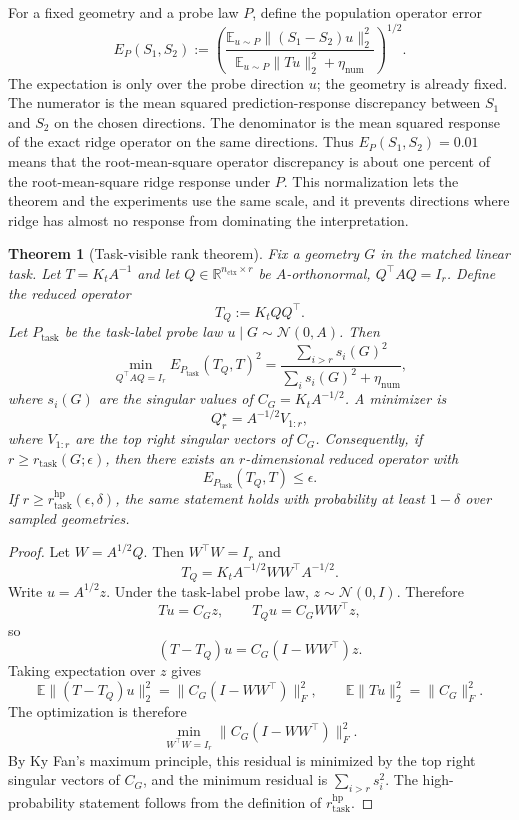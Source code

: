\documentclass[11pt]{article}
\newtheorem{theorem}{Theorem}
\newcommand{\R}{\mathbb{R}}
\newcommand{\E}{\mathbb{E}}
\begin{document}
For a fixed geometry and a probe law \(P\), define the population operator error
\[
E_P(S_1,S_2)
:=
\left(
\frac{
\E_{u\sim P}\|(S_1-S_2)u\|_2^2
}{
\E_{u\sim P}\|Tu\|_2^2+\eta_{\mathrm{num}}
}
\right)^{1/2}.
\]
The expectation is only over the probe direction \(u\); the geometry is already fixed. The numerator
is the mean squared prediction-response discrepancy between \(S_1\) and \(S_2\) on the chosen
directions. The denominator is the mean squared response of the exact ridge operator on the same
directions. Thus \(E_P(S_1,S_2)=0.01\) means that the root-mean-square operator discrepancy is
about one percent of the root-mean-square ridge response under \(P\). This normalization lets the
theorem and the experiments use the same scale, and it prevents directions where ridge has almost
no response from dominating the interpretation.

\begin{theorem}[Task-visible rank theorem]
Fix a geometry \(G\) in the matched linear task. Let \(T=K_tA^{-1}\) and let
\(Q\in\R^{n_{\mathrm{ctx}}\times r}\) be \(A\)-orthonormal, \(Q^\top A Q=I_r\). Define the reduced operator
\[
T_Q:=K_tQQ^\top.
\]
Let \(P_{\mathrm{task}}\) be the task-label probe law \(u\mid G\sim\mathcal{N}(0,A)\). Then
\[
\min_{Q^\top A Q=I_r} E_{P_{\mathrm{task}}}(T_Q,T)^2
=
\frac{\sum_{i>r}s_i(G)^2}{\sum_i s_i(G)^2+\eta_{\mathrm{num}}},
\]
where \(s_i(G)\) are the singular values of \(C_G=K_tA^{-1/2}\). A minimizer is
\[
Q_r^\star=A^{-1/2}V_{1:r},
\]
where \(V_{1:r}\) are the top right singular vectors of \(C_G\). Consequently, if
\(r\ge r_{\mathrm{task}}(G;\epsilon)\), then there exists an \(r\)-dimensional reduced operator with
\[
E_{P_{\mathrm{task}}}(T_Q,T)\le \epsilon.
\]
If \(r\ge r_{\mathrm{task}}^{\mathrm{hp}}(\epsilon,\delta)\), the same statement holds with probability
at least \(1-\delta\) over sampled geometries.
\end{theorem}

\begin{proof}
Let \(W=A^{1/2}Q\). Then \(W^\top W=I_r\) and
\[
T_Q = K_tA^{-1/2}WW^\top A^{-1/2}.
\]
Write \(u=A^{1/2}z\). Under the task-label probe law, \(z\sim\mathcal{N}(0,I)\). Therefore
\[
Tu=C_Gz,\qquad T_Qu=C_GWW^\top z,
\]
so
\[
(T-T_Q)u=C_G(I-WW^\top)z.
\]
Taking expectation over \(z\) gives
\[
\E\|(T-T_Q)u\|_2^2=\|C_G(I-WW^\top)\|_F^2,
\qquad
\E\|Tu\|_2^2=\|C_G\|_F^2.
\]
The optimization is therefore
\[
\min_{W^\top W=I_r}\|C_G(I-WW^\top)\|_F^2.
\]
By Ky Fan's maximum principle, this residual is minimized by the top right singular vectors of
\(C_G\), and the minimum residual is \(\sum_{i>r}s_i^2\). The high-probability statement follows
from the definition of \(r_{\mathrm{task}}^{\mathrm{hp}}\).
\end{proof}
\end{document}
